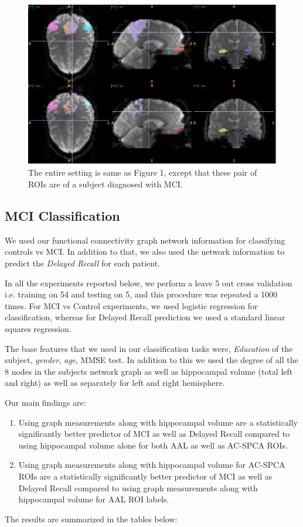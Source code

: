\documentclass{llncs}
\begin{document}
\begin{figure}
\begin{center}
\includegraphics[width=01\linewidth]{aalvspca_mci220.pdf} 
\end{center}
\vspace{-0.2in}
\caption{The entire setting is same as Figure 1, except that these pair of ROIs are of a subject diagnosed with MCI.}
\label{fig:priormci}
\end{figure}

\subsection{MCI Classification}
We used our functional connectivity graph network information for classifying controls vs MCI. In addition to that, we also used the network information to predict the {\it Delayed Recall} for each patient. 


In all the experiments reported below, we perform a leave 5 out cross validation i.e. training on 54 and testing on 5, and this procedure was repeated a 1000 times. For MCI vs Control experiments, we used logistic regression for classification, whereas for Delayed Recall prediction we used a standard linear squares regression. 

The base features that we used in our classification tasks were, {\it Education} of the subject, {\it gender}, {\it age}, MMSE test. In addition to this we used the degree of all the 8 nodes in the subjects network graph as well as hippocampal volume (total left and right) as well as separately for left and right hemisphere. 

Our main findings are:
\begin{enumerate}
\item Using graph measurements along with hippocampal volume are a statistically significantly better predictor of MCI as well as Delayed Recall compared to using hippocampal volume alone for both AAL as well as AC-SPCA ROIs.
\item Using graph measurements along with hippocampal volume for AC-SPCA ROIs are a statistically significantly better predictor of MCI as well as Delayed Recall compared to using graph measurements along with hippocampal volume for AAL ROI labels.
\end{enumerate}
The results are summarized in the tables below:
\end{document}
